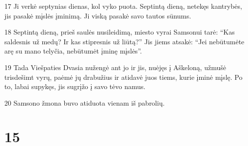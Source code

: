 \par 17 Ji verkė septynias dienas, kol vyko puota. Septintą dieną, netekęs kantrybės, jis pasakė mįslės įminimą. Ji viską pasakė savo tautos sūnums. 
\par 18 Septintą dieną, prieš saulės nusileidimą, miesto vyrai Samsonui tarė: “Kas saldesnis už medų? Ir kas stipresnis už liūtą?” Jis jiems atsakė: “Jei nebūtumėte arę su mano telyčia, nebūtumėt įminę mįslės”. 
\par 19 Tada Viešpaties Dvasia nužengė ant jo ir jis, nuėjęs į Aškeloną, užmušė trisdešimt vyrų, paėmė jų drabužius ir atidavė juos tiems, kurie įminė mįslę. Po to, labai supykęs, jis sugrįžo į savo tėvo namus. 
\par 20 Samsono žmona buvo atiduota vienam iš pabrolių.



\chapter{15}


